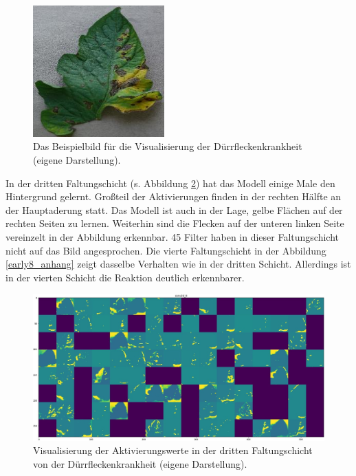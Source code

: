 
\begin{figure}
	\centering
	\includegraphics[width=0.45\textwidth]{visualisierungen/early/early.jpg}%
	\caption{Das Beispielbild für die Visualisierung der Dürrfleckenkrankheit (eigene Darstellung).}
	\label{early_visual}
\end{figure}

In der dritten Faltungschicht (s. Abbildung \ref{early_visual_act}) hat das Modell einige Male den Hintergrund gelernt. Großteil der Aktivierungen finden in der rechten Hälfte an der Hauptaderung statt. Das Modell ist auch in der Lage, gelbe Flächen auf der rechten Seiten zu lernen. Weiterhin sind die Flecken auf der unteren linken Seite vereinzelt in der Abbildung erkennbar. 45 Filter haben in dieser Faltungschicht nicht auf das Bild angesprochen. Die vierte Faltungschicht in der Abbildung \ref{early8_anhang} zeigt dasselbe Verhalten wie in der dritten Schicht. Allerdings ist in der vierten Schicht die Reaktion deutlich erkennbarer.

\begin{figure}[h!]
	\centering
	\includegraphics[width=\textwidth]{visualisierungen/early/activation/early6.JPG}
	\caption{Visualisierung der Aktivierungswerte in der dritten Faltungschicht von der Dürrfleckenkrankheit (eigene Darstellung).}
	\label{early_visual_act}
\end{figure}

